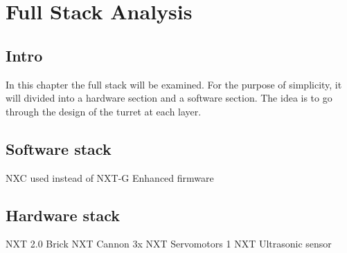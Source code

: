 \chapter{Full Stack Analysis}

\section{Intro}
In this chapter the full stack will be examined. For the purpose of simplicity, it
will divided into a hardware section and a software section. The idea is to go through the
design of the turret at each layer.

\section{Software stack}
NXC used instead of NXT-G
Enhanced firmware

\section{Hardware stack}
NXT 2.0 Brick
NXT Cannon
3x NXT Servomotors
1 NXT Ultrasonic sensor
